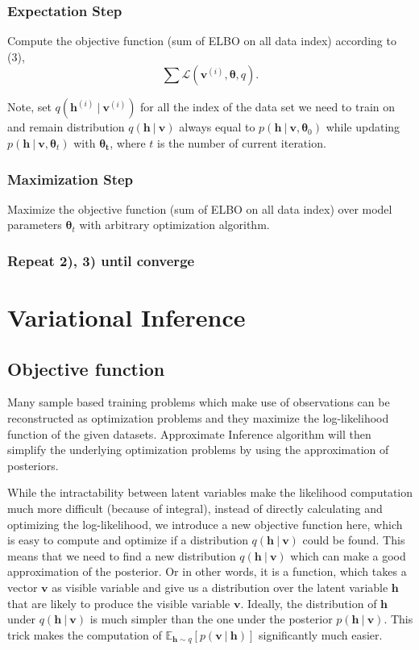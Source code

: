 \documentclass[conference]{IEEEtran}
\begin{document}
\subsubsection{Expectation Step}
Compute the objective function (sum of ELBO on all data index) according to (3), 
\begin{equation}
\sum\mathcal{L}(\boldsymbol{v}^{(i)}, \boldsymbol{\theta}, q).
\end{equation}

Note, set $q(\boldsymbol{h}^{(i)}\ |\ \boldsymbol{v}^{(i)})$ for all the index of the data set we need to train on and remain distribution $q(\boldsymbol{h}\ |\ \boldsymbol{v})$ always equal to $p(\boldsymbol{h}\ |\ \boldsymbol{v}, \boldsymbol{\theta}_0)$ while updating $p(\boldsymbol{h}\ |\ \boldsymbol{v}, \boldsymbol{\theta}_t)$ with $\boldsymbol{\theta_t}$, where $t$ is the number of current iteration.
\subsubsection{Maximization Step}
Maximize the objective function (sum of ELBO on all data index) over model parameters $\boldsymbol{\theta}_t$ with arbitrary optimization algorithm.
\subsubsection{Repeat 2), 3) until converge}
\section{Variational Inference}
\subsection{Objective function}
Many sample based training problems which make use of observations can be reconstructed as optimization problems and they maximize the log-likelihood function of the given datasets. \cite{doersch2016tutorial}\cite{anzai2012pattern} Approximate Inference algorithm will then simplify the underlying optimization problems by using the approximation of posteriors. 

While the intractability between latent variables make the likelihood computation much more difficult (because of integral), instead of directly calculating and optimizing the log-likelihood, we introduce a new objective function here, which is easy to compute and optimize if a distribution $q(\boldsymbol{h}\ |\ \boldsymbol{v})$ could be found. This means that we need to find a new distribution $q(\boldsymbol{h}\ |\ \boldsymbol{v})$ which can make a good approximation of the posterior. Or in other words, it is a function, which takes a vector $\boldsymbol{v}$ as visible variable and give us a distribution over the latent variable $\boldsymbol{h}$ that are likely to produce the visible variable $\boldsymbol{v}$. Ideally, the distribution of $\boldsymbol{h}$ under $q(\boldsymbol{h}\ |\ \boldsymbol{v})$ is much simpler than the one under the posterior $p(\boldsymbol{h}\ |\ \boldsymbol{v})$. This trick makes the computation of $\mathbb{E}_{\boldsymbol{h}\sim q}[p(\boldsymbol{v}\ |\ \boldsymbol{h})]$ significantly much easier.
\end{document}
